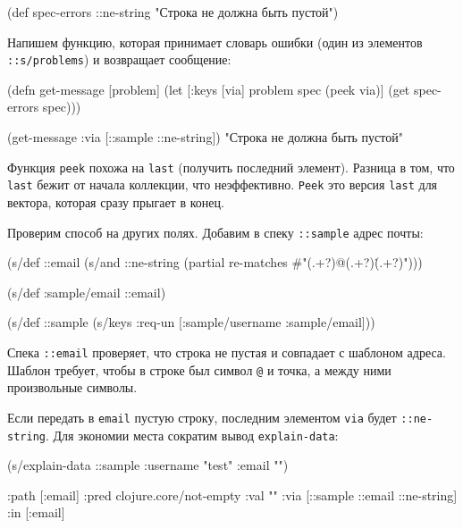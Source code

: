   \begin{clojure}
(def spec-errors
  {::ne-string "Строка не должна быть пустой"})
  \end{clojure}

Напишем функцию, которая принимает словарь ошибки (один из элементов
\verb|::s/problems|) и возвращает сообщение:


  \begin{clojure}
(defn get-message [problem]
  (let [{:keys [via]} problem
        spec (peek via)]
    (get spec-errors spec)))

(get-message {:via [::sample ::ne-string]})
"Строка не должна быть пустой"
  \end{clojure}

Функция \verb|peek| похожа на \verb|last| (получить последний
элемент). Разница в том, что \verb|last| бежит от начала коллекции, что
неэффективно. \verb|Peek| это версия \verb|last| для вектора, которая сразу
прыгает в конец.

Проверим способ на других полях. Добавим в спеку \verb|::sample| адрес почты:


\begin{english}
  \begin{clojure}
(s/def ::email
  (s/and
   ::ne-string
   (partial re-matches #"(.+?)@(.+?)\.(.+?)")))

(s/def :sample/email ::email)

(s/def ::sample
  (s/keys :req-un [:sample/username
                   :sample/email]))
  \end{clojure}
\end{english}

Спека \verb|::email| проверяет, что строка не пустая и совпадает с шаблоном
адреса. Шаблон требует, чтобы в строке был символ \verb|@| и точка, а между
ними произвольные символы.

Если передать в \verb|email| пустую строку, последним элементом \verb|via|
будет \verb|::ne-string|. Для экономии места сократим вывод
\verb|explain-data|:

\begin{english}
  \begin{clojure}
(s/explain-data ::sample {:username "test" :email ""})

{:path [:email]
 :pred clojure.core/not-empty
 :val ""
 :via [::sample ::email ::ne-string]
 :in [:email]}
  \end{clojure}
\end{english}


